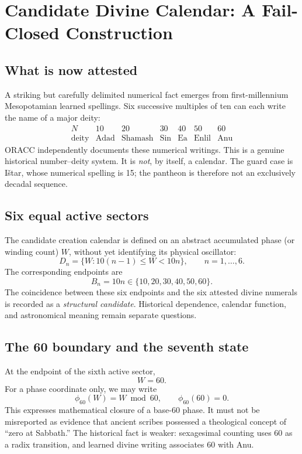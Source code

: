 \section{Candidate Divine Calendar: A Fail-Closed Construction}
\label{sec:divine-calendar}

\subsection{What is now attested}

A striking but carefully delimited numerical fact emerges from first-millennium
Mesopotamian learned spellings.  Six successive multiples of ten can each write
the name of a major deity:
\[
\begin{array}{c|cccccc}
N & 10 & 20 & 30 & 40 & 50 & 60\\ \hline
\text{deity} & \text{Adad} & \text{Shamash} & \text{Sin} & \text{Ea} & \text{Enlil} & \text{Anu}
\end{array}
\]
ORACC independently documents these numerical writings.  This is a genuine
historical number--deity system.  It is \emph{not}, by itself, a calendar.
The guard case is Ištar, whose numerical spelling is 15; the pantheon is
therefore not an exclusively decadal sequence.

\subsection{Six equal active sectors}

The candidate creation calendar is defined on an abstract accumulated phase
(or winding count) $W$, without yet identifying its physical oscillator:
\[
D_n=\{W:10(n-1)\leq W<10n\},\qquad n=1,\ldots,6.
\]
The corresponding endpoints are
\[
B_n=10n\in\{10,20,30,40,50,60\}.
\]
The coincidence between these six endpoints and the six attested divine
numerals is recorded as a \emph{structural candidate}.  Historical dependence,
calendar function, and astronomical meaning remain separate questions.

\subsection{The 60 boundary and the seventh state}

At the endpoint of the sixth active sector,
\[
W=60.
\]
For a phase coordinate only, we may write
\[
\phi_{60}(W)=W\bmod 60,
\qquad
\phi_{60}(60)=0.
\]
This expresses mathematical closure of a base-60 phase.  It must not be
misreported as evidence that ancient scribes possessed a theological concept
of ``zero at Sabbath.''  The historical fact is weaker: sexagesimal counting
uses 60 as a radix transition, and learned divine writing associates 60 with
Anu.

